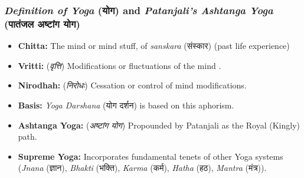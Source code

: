 \begin{frame}[fragile]\frametitle{\textit{Definition of Yoga} (योग) and \textit{Patanjali's Ashtanga Yoga} (पातंजल अष्टांग योग)}

    \begin{itemize}
        \item \textbf{Chitta:} The mind or mind stuff, of \textit{sanskara} (संस्कार) (past life experience)
        \item \textbf{Vritti:} (\textit{वृत्ति}) Modifications or fluctuations of the mind .
        \item \textbf{Nirodhah:}  (\textit{निरोधः}) Cessation or control of mind modifications.
        \item \textbf{Basis:} \textit{Yoga Darshana} (योग दर्शन) is based on this aphorism.
        \item \textbf{Ashtanga Yoga:}  (\textit{अष्टांग योग}) Propounded by Patanjali as the Royal (Kingly) path.
        \item \textbf{Supreme Yoga:} Incorporates fundamental tenets of other Yoga systems (\textit{Jnana} (ज्ञान), \textit{Bhakti} (भक्ति), \textit{Karma} (कर्म), \textit{Hatha} (हठ), \textit{Mantra} (मंत्र)).
    \end{itemize}

\end{frame}





